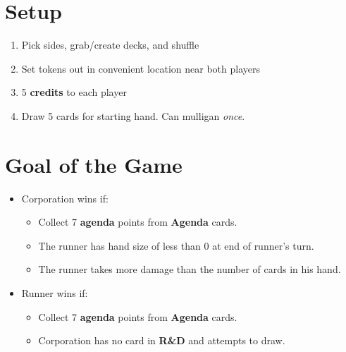 \documentclass[12pt]{article}
\newenvironment{enumerateCustom}
{\begin{enumerate}
  \setlength{\itemsep}{1pt}
  \setlength{\parskip}{0pt}
  \setlength{\parsep}{0pt}}
{\end{enumerate}}
\newenvironment{itemizeCustom}
{\begin{itemize}
  \setlength{\itemsep}{1pt}
  \setlength{\parskip}{0pt}
  \setlength{\parsep}{0pt}}
{\end{itemize}}
\begin{document}
\begin{multicols*}{2}

\section*{Setup}
\begin{enumerateCustom}
	\item Pick sides, grab/create decks, and shuffle
	\item Set tokens out in convenient location near both players
	\item 5 \textbf{credits} to each player
	\item Draw 5 cards for starting hand. Can mulligan \emph{once}.
\end{enumerateCustom}

\section*{Goal of the Game}
\begin{itemizeCustom}
	\item Corporation wins if:
		\begin{itemizeCustom}
			\item Collect 7 \textbf{agenda} points from \textbf{Agenda} cards.
			\item The runner has hand size of less than 0 at end of runner's turn.
			\item The runner takes more damage than the number of cards in his hand.
		\end{itemizeCustom}
	\item Runner wins if:
		\begin{itemizeCustom}
			\item Collect 7 \textbf{agenda} points from \textbf{Agenda} cards.
			\item Corporation has no card in \textbf{R\&D} and attempts to draw.
		\end{itemizeCustom}
\end{itemizeCustom}


\end{multicols*}
\end{document}
